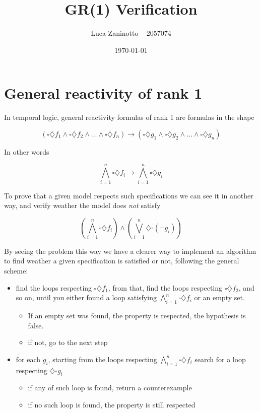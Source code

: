 \documentclass[11pt]{article}
\author{Luca Zaninotto -- 2057074}
\date{\today}
\title{GR(1) Verification}
\begin{document}
\maketitle
\section{General reactivity of rank 1}
\label{sec:org6d8ae8f}
In temporal logic, general reactivity formulas of rank 1 are
formulas in the shape

\[(\square\diamondsuit f_1 \wedge \square\diamondsuit f_2 \wedge \dots \wedge
  \square\diamondsuit f_n) \rightarrow (\square\diamondsuit g_1 \wedge
  \square\diamondsuit g_2 \wedge \dots \wedge \square\diamondsuit g_n)\]

In other words

\[\bigwedge_{i=1}^n\square\diamondsuit f_i \rightarrow \bigwedge_{i=1}^n
  \square \diamondsuit g_i\]

To prove that a given model respects such specifications we can see
it in another way, and verify weather the model does \emph{not} satisfy

\[(\bigwedge_{i=1}^n\square\diamondsuit f_i) \wedge
  (\bigvee_{i=1}^n\diamondsuit\square (\neg g_i))\]

By seeing the problem this way we have a clearer way to implement an
algorithm to find weather a given specification is satisfied or not,
following the general scheme:
\begin{itemize}
\item find the loops respecting \(\square\diamondsuit f_1\), from that, find
the loops respecting \(\square\diamondsuit f_2\), and so on, until you
either found a loop satisfying \(\bigwedge_{i=1}^n\square\diamondsuit
    f_i\) or an empty set.
\begin{itemize}
\item If an empty set was found, the property is respected, the
hypothesis is false.
\item if not, go to the next step
\end{itemize}
\item for each \(g_i\), starting from the loops respecting
\(\bigwedge_{i=1}^n\square\diamondsuit f_i\) search for a loop
respecting \(\diamondsuit\square g_i\)
\begin{itemize}
\item if any of such loop is found, return a counterexample
\item if no such loop is found, the property is still respected
\end{itemize}
\end{itemize}
\end{document}
